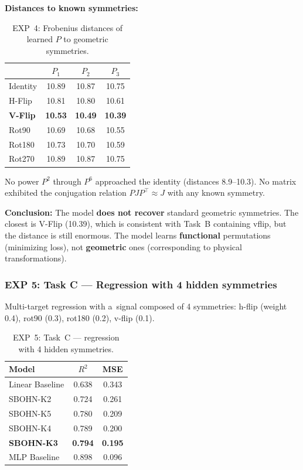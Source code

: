 \documentclass[11pt,a4paper]{report}
\begin{document}
\textbf{Distances to known symmetries:}
\begin{table}[h]
\centering
\caption{EXP~4: Frobenius distances of learned $P$ to geometric symmetries.}
\begin{tabular}{lccc}
\hline
 & $P_1$ & $P_2$ & $P_3$ \\
\hline
Identity & 10.89 & 10.87 & 10.75 \\
H-Flip   & 10.81 & 10.80 & 10.61 \\
\textbf{V-Flip} & \textbf{10.53} & \textbf{10.49} & \textbf{10.39} \\
Rot90    & 10.69 & 10.68 & 10.55 \\
Rot180   & 10.73 & 10.70 & 10.59 \\
Rot270   & 10.89 & 10.87 & 10.75 \\
\hline
\end{tabular}
\end{table}

No power $P^2$ through $P^6$ approached the identity (distances 8.9--10.3). No matrix exhibited the conjugation relation $PJP^\top \approx J$ with any known symmetry.

\textbf{Conclusion:} The model \textbf{does not recover} standard geometric symmetries. The closest is V-Flip (10.39), which is consistent with Task~B containing vflip, but the distance is still enormous. The model learns \textbf{functional} permutations (minimizing loss), not \textbf{geometric} ones (corresponding to physical transformations).

\subsubsection*{EXP 5: Task C --- Regression with 4 hidden symmetries}

Multi-target regression with a~signal composed of 4 symmetries: h-flip (weight 0.4), rot90 (0.3), rot180 (0.2), v-flip (0.1).

\begin{table}[h]
\centering
\caption{EXP~5: Task~C --- regression with 4 hidden symmetries.}
\begin{tabular}{lcc}
\hline
\textbf{Model} & $R^2$ & \textbf{MSE} \\
\hline
Linear Baseline   & 0.638 & 0.343 \\
SBOHN-K2          & 0.724 & 0.261 \\
SBOHN-K5          & 0.780 & 0.209 \\
SBOHN-K4          & 0.789 & 0.200 \\
\textbf{SBOHN-K3} & \textbf{0.794} & \textbf{0.195} \\
MLP Baseline      & 0.898 & 0.096 \\
\hline
\end{tabular}
\end{table}
\end{document}
